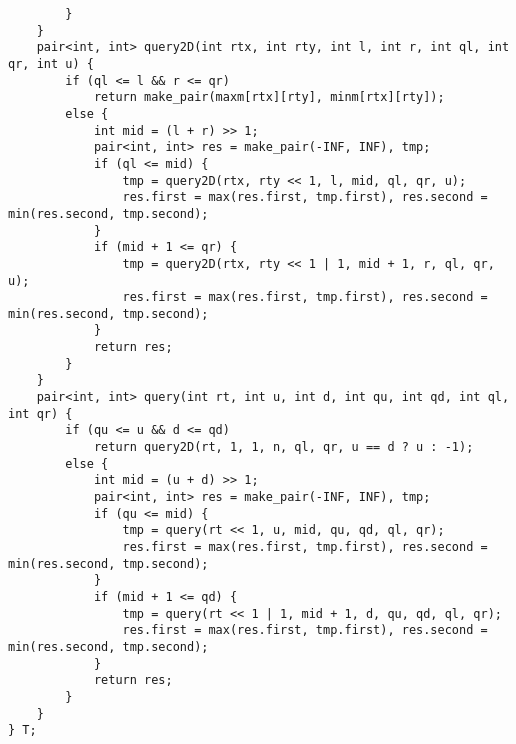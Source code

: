 \begin{verbatim}
        }
    }
    pair<int, int> query2D(int rtx, int rty, int l, int r, int ql, int qr, int u) {
        if (ql <= l && r <= qr)
            return make_pair(maxm[rtx][rty], minm[rtx][rty]);
        else {
            int mid = (l + r) >> 1;
            pair<int, int> res = make_pair(-INF, INF), tmp;
            if (ql <= mid) {
                tmp = query2D(rtx, rty << 1, l, mid, ql, qr, u);
                res.first = max(res.first, tmp.first), res.second = min(res.second, tmp.second);
            }
            if (mid + 1 <= qr) {
                tmp = query2D(rtx, rty << 1 | 1, mid + 1, r, ql, qr, u);
                res.first = max(res.first, tmp.first), res.second = min(res.second, tmp.second);
            }
            return res;    
        }
    }
    pair<int, int> query(int rt, int u, int d, int qu, int qd, int ql, int qr) {
        if (qu <= u && d <= qd)
            return query2D(rt, 1, 1, n, ql, qr, u == d ? u : -1);
        else {
            int mid = (u + d) >> 1;
            pair<int, int> res = make_pair(-INF, INF), tmp;
            if (qu <= mid) {
                tmp = query(rt << 1, u, mid, qu, qd, ql, qr);
                res.first = max(res.first, tmp.first), res.second = min(res.second, tmp.second);
            }
            if (mid + 1 <= qd) {
                tmp = query(rt << 1 | 1, mid + 1, d, qu, qd, ql, qr);
                res.first = max(res.first, tmp.first), res.second = min(res.second, tmp.second);
            }
            return res;
        }
    }
} T;
\end{verbatim}

